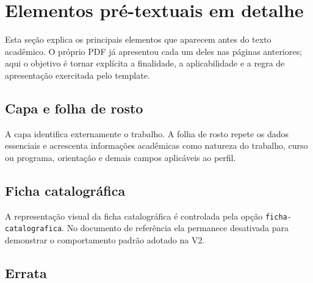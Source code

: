 \section{Elementos pré-textuais em detalhe}\label{sec:pretextuais-detalhe}

Esta seção explica os principais elementos que aparecem antes do texto acadêmico. O próprio PDF já apresentou cada um deles nas páginas anteriores; aqui o objetivo é tornar explícita a finalidade, a aplicabilidade e a regra de apresentação exercitada pelo template.

\subsection{Capa e folha de rosto}

A capa identifica externamente o trabalho. A folha de rosto repete os dados essenciais e acrescenta informações acadêmicas como natureza do trabalho, curso ou programa, orientação e demais campos aplicáveis ao perfil.



\subsection{Ficha catalográfica}

A representação visual da ficha catalográfica é controlada pela opção \texttt{ficha-catalografica}. No documento de referência ela permanece desativada para demonstrar o comportamento padrão adotado na V2.


\subsection{Errata}

